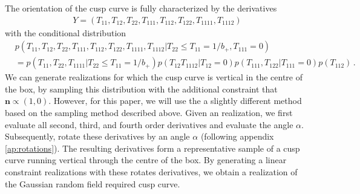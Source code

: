 \documentclass[a4paper, 11pt]{article}
\begin{document}
The orientation of the cusp curve is fully characterized by the derivatives  
\begin{align}
Y=(T_{11},T_{12},T_{22},T_{111},T_{112},T_{122},T_{1111},T_{1112})
\end{align}
with the conditional distribution
\begin{align}
&p(T_{11},T_{12},T_{22},T_{111},T_{112},T_{122},T_{1111},T_{1112}|T_{22} \leq T_{11}=1/b_+, T_{111}=0)\\
&=
p(T_{11},T_{22},T_{1111}|T_{22}\leq T_{11}=1/b_+)p(T_{12}T_{1112}|T_{12}=0)p(T_{111},T_{122}|T_{111}=0)p(T_{112})\,.
\end{align}
We can generate realizations for which the cusp curve is vertical in the centre of the box, by sampling this distribution with the additional constraint that $\bm{n} \propto (1,0)$. However, for this paper, we will use the a slightly different method based on the sampling method described above. Given an realization, we first evaluate all second, third, and fourth order derivatives and evaluate the angle $\alpha$. Subsequently, rotate these derivatives by an angle $\alpha$ (following appendix \ref{ap:rotations}). The resulting derivatives form a representative sample of a cusp curve running vertical through the centre of the box. By generating a linear constraint realizations with these rotates derivatives, we obtain a realization of the Gaussian random field required cusp curve.
\end{document}
